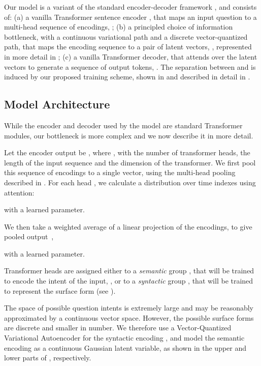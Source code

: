 \documentclass[11pt,a4paper]{article}
\begin{document}
Our model is a variant of the standard encoder-decoder framework
\cite{Cho2014a}, and consists of: (a) a vanilla Transformer sentence
encoder \cite{Vaswani2017}, that maps an input question 
to a multi-head sequence of encodings, ; (b) a principled choice of information
bottleneck, with a continuous variational path and a discrete vector-quantized
path, that maps the encoding sequence to a pair of latent vectors,
, represented in more detail in
; (c) a vanilla Transformer decoder, that attends
over the latent vectors to generate a sequence of output tokens,
. The separation between  and
 is induced by our proposed training scheme, shown
in  and described in detail in .

\subsection{Model Architecture}
\label{sec:bottleneck}

While the encoder and decoder used by the model are standard
Transformer modules, our bottleneck is more complex and we now describe it in more detail.

Let the encoder output be , where
,  with 
the number of transformer heads,  the length of the
input sequence and  the dimension of the transformer. We first pool
this sequence of encodings to a single vector, using the multi-head
pooling described in . For each
head , we calculate a distribution over time indexes 
using attention:


with  a learned parameter. 

We then take a weighted average of a linear projection of the
encodings, to give pooled output~,

with  a learned parameter.

Transformer heads are assigned either to a \textit{semantic} group , that
will be trained to encode the intent of the input,
, or to a \textit{syntactic} group , that will be
trained to represent the surface form  (see
). 

The space of possible question intents is
extremely large and may be reasonably approximated by a continuous
vector space. However, the possible surface forms are discrete and
smaller in number. We therefore use a
Vector-Quantized Variational Autoencoder \citep[VQ-VAE,][]{vqvae} for
the syntactic encoding , and model the semantic encoding
 as a continuous Gaussian latent variable, as shown in the upper and
lower parts of , respectively.
\end{document}
